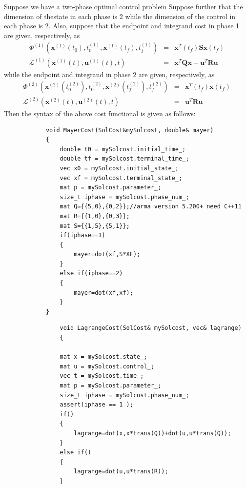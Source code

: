 \documentclass[10pt]{article}
\begin{document}
\begin{itemize}
\begin{frame}
			Suppose we have a two-phase optimal control problem Suppose further that the dimension of thestate in each phase is 2 while the dimension of the control in each phase is
			2.  Also, suppose that the endpoint and integrand cost in phase 1 are
			given, respectively, as
			\begin{displaymath}
			\begin{array}{lcl}
			\Phi^{(1)}(\mathbf x^{(1)}(t_0),t_0^{(1)},\mathbf x^{(1)}(t_f),t_f^{(1)}) & = & \mathbf x^T(t_f)\mathbf S\mathbf x(t_f) \\
			\mathcal L^{(1)}(\mathbf x^{(1)}(t),\mathbf u^{(1)}(t),t) & = & \mathbf x^T\mathbf Q\mathbf x + \mathbf u^T\mathbf R\mathbf u
			\end{array}
			\end{displaymath}
			while the endpoint and integrand in phase 2 are given, respectively, as
			\begin{displaymath}
			\begin{array}{lcl}
			\Phi^{(2)}(\mathbf x^{(2)}(t_0^{(2)}),t_0^{(2)},\mathbf x^{(2)}(t_f^{(2)}),t_f^{(2)}) & = & \mathbf x^T(t_f)\mathbf x(t_f) \\
			\mathcal L^{(2)}(\mathbf x^{(2)}(t),\mathbf u^{(2)}(t),t) & = & \mathbf u^T\mathbf R\mathbf u
			\end{array}
			\end{displaymath}
			Then the syntax of the above cost functional is given as follows:
			\begin{lstlisting}
			void MayerCost(SolCost&mySolcost, double& mayer)
			{
				double t0 = mySolcost.initial_time_;
				double tf = mySolcost.terminal_time_;
				vec x0 = mySolcost.initial_state_;
				vec xf = mySolcost.terminal_state_;
				mat p = mySolcost.parameter_;
				size_t iphase = mySolcost.phase_num_;
				mat Q={{5,0},{0,2}};//arma version 5.200+ need C++11
				mat R={{1,0},{0,3}};
				mat S={{1,5},{5,1}};
				if(iphase==1)
				{
				    mayer=dot(xf,S*XF);
				}
				else if(iphase==2)
				{
					mayer=dot(xf,xf);
				}
			}
			\end{lstlisting}
			\begin{lstlisting}
				void LagrangeCost(SolCost& mySolcost, vec& lagrange)
				{
				
				mat x = mySolcost.state_;
				mat u = mySolcost.control_;
				vec t = mySolcost.time_;
				mat p = mySolcost.parameter_;
				size_t iphase = mySolcost.phase_num_;
				assert(iphase == 1 );
				if()
				{
					lagrange=dot(x,x*trans(Q))+dot(u,u*trans(Q));
				}
				else if()
				{
					lagrange=dot(u,u*trans(R));
				}
				

\end{lstlisting}
\end{frame}
\end{itemize}
\end{document}
